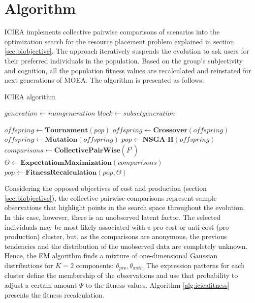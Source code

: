 \documentclass{llncs}
\begin{document}
\FloatBarrier


\section{Algorithm}\label{sec:algorithms}

ICIEA implements collective pairwise comparisons of scenarios into the optimization search for the resource placement problem explained in section \ref{sec:biobjective}. The approach iteratively suspends  the evolution to ask users for their preferred individuals in the population. Based on the group's subjectivity and cognition, all the population fitness values are recalculated and reinstated for next generations of MOEA. The algorithm is presented as follows:


\begin{algorithm}
\caption{ICIEA algorithm}
\label{alg:iciea}
\begin{algorithmic}[1]

\State $generation\gets num generation$ 
\State $block\gets subset generation$

		\State $offspring\gets \textbf{Tournament}(pop)$
		\State $offspring\gets \textbf{Crossover}(offspring)$
		\State $offspring\gets \textbf{Mutation}(offspring)$
		\State $pop\gets \textbf{NSGA-II}(offspring)$
	\EndWhile
	\State $comparisons\gets \textbf{CollectivePairWise}(F^i) $
	\State $\Theta\gets \textbf{ExpectatiomMaximization}(comparisons)$
	\State $pop\gets \textbf{FitnessRecalculation}(pop,\Theta)$
\EndWhile

\end{algorithmic}
\end{algorithm}

\FloatBarrier

Considering the opposed objectives of cost and production (section \ref{sec:biobjective}), the collective pairwise comparisons represent sample observations that highlight points in the search space throughout the evolution.   In this case, however, there is an unobserved latent factor. The selected individuals may be most likely associated with a pro-cost or anti-cost (pro-production)  cluster, but, as the comparisons are anonymous, the previous tendencies and the distribution of the unobserved data are completely unknown. Hence, the EM algorithm finds a mixture of one-dimensional Gaussian distributions for $K=2$ components: $\theta_{pro}, \theta_{anti}$. The expression patterns for each cluster define the membership of the observations and use that probability to adjust a certain amount $\Psi$ to the fitness values. Algorithm \ref{alg:icieafitness} presents the fitness recalculation. 
\end{document}
